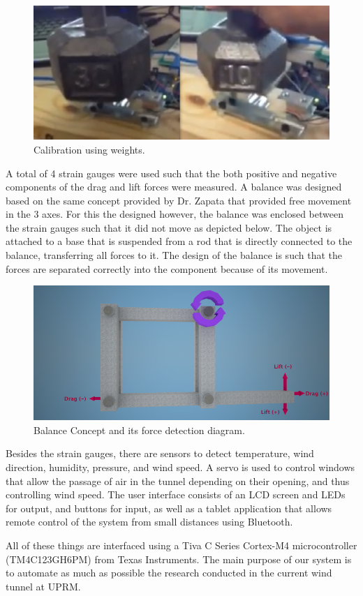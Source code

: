 		\begin{figure}[H]
			\centering
				\includegraphics[scale=0.25]{img/loadcell-calibration}
			\caption{Calibration using weights.}
		\end{figure}

	A total of 4 strain gauges were used such that the both positive and negative components of the drag and lift forces were measured. A balance was designed based on the same concept provided by Dr. Zapata that provided free movement in the 3 axes. For this the designed however, the balance was enclosed between the strain gauges such that it did not move as depicted below. The object is attached to a base that is suspended from a rod that is directly connected to the balance, transferring all forces to it. The design of the balance is such that the forces are separated correctly into the component because of its movement.

	\begin{figure}[H]
			\centering
				\includegraphics[scale=0.4]{img/balance-concept}
			\caption{Balance Concept and its force detection diagram. \cite{ref:wright5}}
		\end{figure}

	Besides the strain gauges, there are sensors to detect temperature, wind direction, humidity, pressure, and wind speed. 
	A servo is used to control windows that allow the passage of air in the tunnel depending on their opening, and thus controlling wind speed.
	The user interface consists of an LCD screen and LEDs for output, and buttons for input, as well as a tablet application that allows remote control of the system from small distances using Bluetooth.
	 
	All of these things are interfaced using a Tiva C Series Cortex-M4 microcontroller (TM4C123GH6PM) from Texas Instruments. The main purpose of our system is to automate as much as possible the research conducted in the current wind tunnel at UPRM.



	

